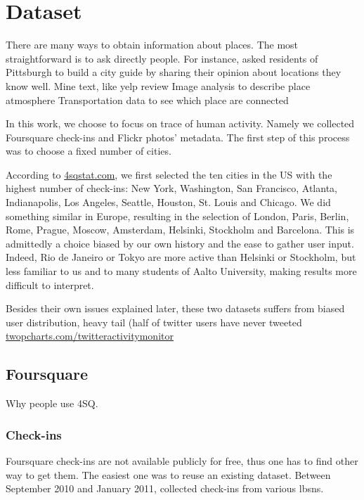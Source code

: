\chapter{Dataset}
\label{chap:dataset}

There are many ways to obtain information about places. The most
straightforward is to ask directly people. For instance, \textcite{Curated14}
 asked residents of Pittsburgh to build a city
guide by sharing their opinion about locations they know well.
Mine text, like yelp review \autocite{YelpReview14}
Image analysis to describe place atmosphere
Transportation data to see which place are connected

In this work, we choose to focus on trace of human activity. Namely we
collected Foursquare check-ins and Flickr photos' metadata. The first step of
this process was to choose a fixed number of cities.

According to \href{http://www.4sqstat.com/}{4sqstat.com}, we first selected
the ten cities in the US with the highest number of check-ins: New York,
Washington, San Francisco, Atlanta, Indianapolis, Los Angeles, Seattle,
Houston, St. Louis and Chicago. We did something similar in Europe,
resulting in the selection of London, Paris, Berlin, Rome, Prague, Moscow,
Amsterdam, Helsinki, Stockholm and Barcelona. This is admittedly a choice
biased by our own history and the ease to gather user input. Indeed, Rio
de Janeiro or Tokyo are more active than Helsinki or Stockholm, but less
familiar to us and to many students of Aalto University, making results more
difficult to interpret.

Besides their own issues explained later, these two datasets suffers from
biased user distribution\autocite{Weird10}, heavy tail (half of twitter users
have never tweeted \href{http://twopcharts.com/twitteractivitymonitor}%
{\url{twopcharts.com/twitteractivitymonitor}}

\section{Foursquare}

Why people use 4SQ\autocite{FSMotivation11}.

\subsection{Check-ins}

Foursquare check-ins are not available publicly for free, thus one has to
find other way to get them. The easiest one was to reuse an existing dataset.
Between September 2010 and January 2011, \textcite{dataset11} collected
 check-ins from various \glspl{lbsn}.

